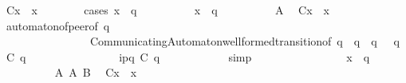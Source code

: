 \begin{isabellebody}
\ {\isachardoublequoteopen}C{}{\isacharparenleft}{\kern0pt}x{\isacharparenright}{\kern0pt}\ {\isasymin}\ {\isasymS}{\isacharparenleft}{\kern0pt}x{\isacharparenright}{\kern0pt}{\isachardoublequoteclose}\isanewline
\ \ \ \ \ \ \isamarkupfalse%
\ {\isacharparenleft}{\kern0pt}cases\ {\isachardoublequoteopen}x\ {\isacharequal}{\kern0pt}\ q{\isachardoublequoteclose}{\isacharparenright}{\kern0pt}\isanewline
\ \ \ \ \ \ \ \ \isamarkupfalse%
\ {\isachardoublequoteopen}x\ {\isacharequal}{\kern0pt}\ q{\isachardoublequoteclose}\isanewline
\ \ \ \ \ \ \ \ \isamarkupfalse%
\ A{}\ \isamarkupfalse%
\ {\isachardoublequoteopen}C{}{\isacharparenleft}{\kern0pt}x{\isacharparenright}{\kern0pt}\ {\isasymin}\ {\isasymS}{\isacharparenleft}{\kern0pt}x{\isacharparenright}{\kern0pt}{\isachardoublequoteclose}\isanewline
\ \ \ \ \ \ \ \ \ \ \isamarkupfalse%
\ automaton{\isacharunderscore}{\kern0pt}of{\isacharunderscore}{\kern0pt}peer{\isacharbrackleft}{\kern0pt}of\ q{\isacharbrackright}{\kern0pt}\isanewline
\ \ \ \ \ \ \ \ \ \ \ \ \ \ \ \ CommunicatingAutomaton{\isachardot}{\kern0pt}well{\isacharunderscore}{\kern0pt}formed{\isacharunderscore}{\kern0pt}transition{\isacharbrackleft}{\kern0pt}of\ q\ {\isachardoublequoteopen}{\isasymS}\ q{\isachardoublequoteclose}\ {\isachardoublequoteopen}{\isasymI}\ q{\isachardoublequoteclose}\ {\isasymM}\ {\isachardoublequoteopen}{\isasymR}\ q{\isachardoublequoteclose}\ {\isachardoublequoteopen}C{}\ q{\isachardoublequoteclose}\isanewline
\ \ \ \ \ \ \ \ \ \ \ \ \ \ \ \ {\isachardoublequoteopen}{\isacharquery}{\kern0pt}{\isasymlangle}{\isacharparenleft}{\kern0pt}i\isactrlbsup p{\isasymrightarrow}q\isactrlesup {\isacharparenright}{\kern0pt}{\isasymrangle}{\isachardoublequoteclose}\ {\isachardoublequoteopen}C{}\ q{\isachardoublequoteclose}{\isacharbrackright}{\kern0pt}\isanewline
\ \ \ \ \ \ \ \ \ \ \isamarkupfalse%
\ simp\isanewline
\ \ \ \ \ \ \isamarkupfalse%
\isanewline
\ \ \ \ \ \ \ \ \isamarkupfalse%
\ {\isachardoublequoteopen}x\ {\isasymnoteq}\ q{\isachardoublequoteclose}\isanewline
\ \ \ \ \ \ \ \ \isamarkupfalse%
\ A{}\ A{}\ B\ \isamarkupfalse%
\ {\isachardoublequoteopen}C{}{\isacharparenleft}{\kern0pt}x{\isacharparenright}{\kern0pt}\ {\isasymin}\ {\isasymS}{\isacharparenleft}{\kern0pt}x{\isacharparenright}{\kern0pt}{\isachardoublequoteclose}\isanewline

\end{isabellebody}
